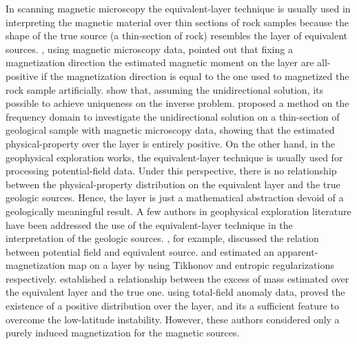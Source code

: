 In scanning magnetic microscopy the equivalent-layer technique is usually used in interpreting the magnetic material over thin sections of rock samples because the shape of the true source (a thin-section of rock) resembles the layer of equivalent sources. \cite{weiss2007}, using magnetic microscopy data, pointed out that fixing a magnetization direction the estimated magnetic moment on the layer are all-positive if the magnetization direction is equal to the one used to magnetized the rock sample artificially. \cite{baratchart2013} show that, assuming the unidirectional solution, its possible to achieve uniqueness on the inverse problem. \cite{lima2013} proposed a method on the frequency domain to investigate the unidirectional solution on a thin-section of geological sample with magnetic microscopy data, showing that the estimated physical-property over the layer is entirely positive. On the other hand, in the geophysical exploration works, the equivalent-layer technique is usually used for processing potential-field data. Under this perspective, there is no relationship between the physical-property distribution on the equivalent layer and the true geologic sources. Hence, the layer is just a mathematical abstraction devoid of a geologically meaningful result. A few authors in geophysical exploration literature have been addressed the use of the equivalent-layer technique in the interpretation of the geologic sources. \cite{pedersen1991}, for example, discussed the relation between potential field and equivalent source. \cite{medeiros_silva1996} and \cite{silvadias_etal_2010} estimated an apparent-magnetization map on a layer by using Tikhonov and entropic regularizations respectively. \cite{siqueira_etal_2017} established a relationship between the excess of mass estimated over the equivalent layer and the true one. \cite{li_nabighian_oldenburg_2014} using total-field anomaly data, proved the existence of a positive distribution over the layer, and its a sufficient feature to overcome the low-latitude instability. However, these authors considered only a purely induced magnetization for the magnetic sources.

